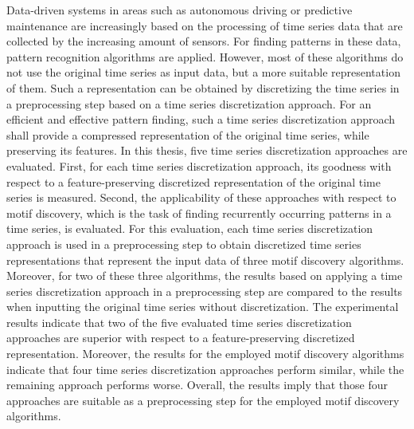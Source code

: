 Data-driven systems in areas such as autonomous driving or predictive maintenance are increasingly based on the processing of time series data that are collected by the increasing amount of sensors. For finding patterns in these data, pattern recognition algorithms are applied. However, most of these algorithms do not use the original time series as input data, but a more suitable representation of them. Such a representation can be obtained by discretizing the time series in a preprocessing step based on a time series discretization approach. For an efficient and effective pattern finding, such a time series discretization approach shall provide a compressed representation of the original time series, while preserving its features. \newline
In this thesis, five time series discretization approaches are evaluated. First, for each time series discretization approach, its goodness with respect to a feature-preserving discretized representation of the original time series is measured. Second, the applicability of these approaches with respect to motif discovery, which is the task of finding recurrently occurring patterns in a time series, is evaluated. For this evaluation, each time series discretization approach is used in a preprocessing step to obtain discretized time series representations that represent the input data of three motif discovery algorithms. Moreover, for two of these three algorithms, the results based on applying a time series discretization approach in a preprocessing step are compared to the results when inputting the original time series without discretization. \newline
The experimental results indicate that two of the five evaluated time series discretization approaches are superior with respect to a feature-preserving discretized representation. Moreover, the results for the employed motif discovery algorithms indicate that four time series discretization approaches perform similar, while the remaining approach performs worse. Overall, the results imply that those four approaches are suitable as a preprocessing step for the employed motif discovery algorithms.

